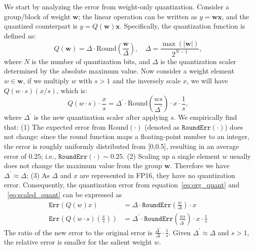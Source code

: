We start by analyzing the error from weight-only quantization. 
Consider a group/block of weight $\mathbf{w}$; the linear operation can be written as $y=\mathbf{w}\mathbf{x}$, and the quantized counterpart is $y=Q(\mathbf{w})\mathbf{x}$. Specifically, the quantization function is defined as:
\begin{equation}
    Q(\mathbf{w}) = \Delta \cdot \text{Round}(\frac{\mathbf{w}}{\Delta}), \quad \Delta = \frac{\max(|\mathbf{w}|)}{2^{N-1}},
    \label{eq:org_quant}
\end{equation}
where $N$ is the number of quantization bits, and $\Delta$ is the quantization scaler determined by the absolute maximum value. Now consider a weight element $w\in \mathbf{w}$, if we multiply $w$ with $s> 1$ and the inversely scale $x$, we will have $Q(w\cdot s)(x/s)$, which is:
\begin{equation}
    Q(w\cdot s)\cdot \frac{x}{s} = \Delta^{'} \cdot \text{Round}(\frac{ws}{\Delta^{'}}) \cdot x \cdot \frac{1}{s},
    \label{eq:scaled_quant}
\end{equation}
where $\Delta^{'}$ is the new quantization scaler after applying $s$. We empirically find that: (1) The expected error from $\text{Round}(\cdot)$ (denoted as $\texttt{RoundErr}(\cdot)$) does not change: since the round function maps a floating-point number to an integer, the error is roughly uniformly distributed from [0,0.5], resulting in an average error of $0.25$; i.e., $\texttt{RoundErr}(\cdot)\sim 0.25$. (2) Scaling up a single element $w$ usually does not change the maximum value from the group $\mathbf{w}$. Therefore we have $\Delta^{'}\approx\Delta$;
(3) As $\Delta$ and $x$ are represented in FP16, they have no quantization error. Consequently, the quantization error from equation~\ref{eq:org_quant} and ~\ref{eq:scaled_quant} can be expressed as 
\begin{equation}
\begin{aligned}
\texttt{Err}(Q(w) x) &= \Delta\cdot \texttt{RoundErr}(\frac{w}{\Delta})\cdot x \\
\texttt{Err}(Q(w \cdot s)(\frac{x}{s})) &= \Delta^{'}\cdot \texttt{RoundErr}(\frac{ws}{\Delta^{'}})\cdot x\cdot \frac{1}{s}
\end{aligned}
\end{equation}
The ratio of the new error to the original error is $\frac{\Delta^{'}}{\Delta} \cdot \frac{1}{s}$. Given $\Delta^{'}\approx\Delta$ and $s>1$, the relative error is smaller for the salient weight $w$. 

